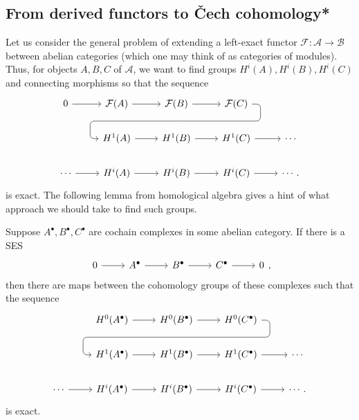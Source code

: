 \subsection{From derived functors to \v Cech cohomology*}
Let us consider the general problem of extending a left-exact
functor $\mathcal{F}:\mathcal{A}\to\mathcal{B}$ between abelian categories
(which one may think of as categories of modules). Thus, for objects
$A,B,C$ of $\mathcal{A}$, we want to find groups $H^{i}(A),H^{i}(B),H^{i}(C)$
and connecting morphisms so that the sequence
\[
\begin{tikzcd}
  0 \rar & \mathcal{F}(A) \rar & \mathcal{F}(B)
  \rar\dar[phantom, ""{coordinate, name=Z}] & \mathcal{F}(C)
  \arrow[rounded corners, to path={ -- ([xshift=2ex]\tikztostart.east)
    |- (Z) -| ([xshift=-2ex]\tikztotarget.west) -- (\tikztotarget)},
  overlay]{dll} & \\
    & H^{1}(A) \rar & H^{1}(B)\rar & H^{1}(C) \rar & \cdots \\
  \cdots \rar& H^{i}(A) \rar & H^{i}(B)\rar & H^{i}(C) \rar & \cdots.
\end{tikzcd}
\]
is exact. The following lemma from homological algebra gives a hint of
what approach we should take to find such groups.
\begin{lemm}
  Suppose $A^{\bullet},B^{\bullet},C^{\bullet}$ are cochain complexes in some
  abelian category. If there is a SES
  \[\begin{tikzcd}
      0\rar & A^{\bullet}\rar & B^{\bullet}\rar & C^{\bullet}\rar & 0
    \end{tikzcd},\]
  then there are maps between the cohomology groups of these complexes
  such that the sequence
  \[\begin{tikzcd}
    & H^{0}(A^{\bullet}) \rar & H^{0}(B^{\bullet})
    \rar\dar[phantom, ""{coordinate, name=Z}] & H^{0}(C^{\bullet})
    \arrow[rounded corners, to path={ -- ([xshift=2ex]\tikztostart.east)
      |- (Z) -| ([xshift=-2ex]\tikztotarget.west) -- (\tikztotarget)},
    overlay]{dll} & \\
    & H^{1}(A^{\bullet}) \rar & H^{1}(B^{\bullet})\rar
    & H^{1}(C^{\bullet}) \rar & \cdots \\
    \cdots \rar& H^{i}(A^{\bullet}) \rar & H^{i}(B^{\bullet})\rar
    & H^{i}(C^{\bullet}) \rar & \cdots.
    \end{tikzcd}\]
  is exact.
\end{lemm}
